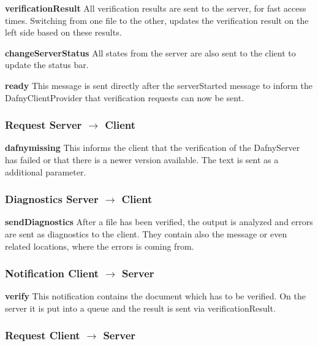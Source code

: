 \textbf{verificationResult}
All verification results are sent to the server, for fast access times. Switching from one file to the other, updates the verification result on the left side based on these results. \newline

\textbf{changeServerStatus}
All states from the server are also sent to the client to update the status bar. \newline

\textbf{ready}
This message is sent directly after the serverStarted message to inform the DafnyClientProvider that verification requests can now be sent. \newline

\subsubsection{Request Server $\longrightarrow$ Client}

\textbf{dafnymissing}
This informs the client that the verification of the DafnyServer has failed or that there is a newer version available. The text is sent as a additional parameter.  \newline

\subsubsection{Diagnostics Server $\longrightarrow$ Client}

\textbf{sendDiagnostics}
After a file has been verified, the output is analyzed and errors are sent as diagnostics to the client. They contain also the message or even related locations, where the errors is coming from.  \newline

\subsubsection{Notification Client $\longrightarrow$ Server}

\textbf{verify}
This notification contains the document which has to be verified. On the server it is put into a queue and the result is sent via verificationResult. \newline

\subsubsection{Request Client $\longrightarrow$ Server}

